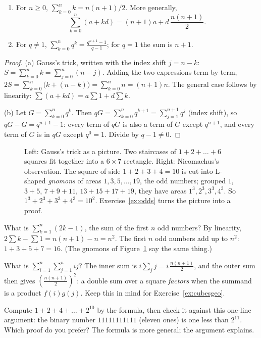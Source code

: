 \begin{propositionx}
\begin{enumerate}[label=(\alph*)]
\item For $n\ge0$, $\sum_{k=0}^nk=n(n+1)/2$. More generally,
\[
\sum_{k=0}^n(a+kd)=(n+1)a+d\,\frac{n(n+1)}2.
\]
\item For $q\ne1$, $\displaystyle\sum_{k=0}^nq^k=\frac{q^{n+1}-1}{q-1}$; for $q=1$ the sum is $n+1$.
\end{enumerate}
\end{propositionx}
\begin{proof}
(a) Gauss's trick, written with the index shift $j=n-k$: $S=\sum_{k=0}^nk=\sum_{j=0}^n(n-j)$. Adding the two expressions term by term,
$2S=\sum_{k=0}^n\bigl(k+(n-k)\bigr)=\sum_{k=0}^nn=(n+1)n$. The general case follows by linearity: $\sum(a+kd)=a\sum1+d\sum k$.

(b) Let $G=\sum_{k=0}^nq^k$. Then $qG=\sum_{k=0}^nq^{k+1}=\sum_{j=1}^{n+1}q^j$ (index shift), so $qG-G=q^{n+1}-1$: every term of $qG$ is also a term of
$G$ except $q^{n+1}$, and every term of $G$ is in $qG$ except $q^0=1$. Divide by $q-1\ne0$.
\end{proof}

\begin{figure}[ht]
\centering
{}
\caption{Left: Gauss's trick as a picture. Two staircases of $1+2+\dots+6$ squares fit together into a $6\times7$ rectangle. Right: Nicomachus's observation. The square of side $1+2+3+4=10$ is cut into L-shaped \emph{gnomons} of areas $1,3,5,\dots,19$, the odd numbers; grouped $1$, $3+5$, $7+9+11$, $13+15+17+19$, they have areas $1^3,2^3,3^3,4^3$. So $1^3+2^3+3^3+4^3=10^2$. Exercise~\ref{ex:odds} turns the picture into a proof.}
\label{fig:gauss}
\end{figure}

\begin{examplex}
What is $\sum_{k=1}^n(2k-1)$, the sum of the first $n$ odd numbers? By linearity, $2\sum k-\sum1=n(n+1)-n=n^2$. The first $n$ odd numbers add up to
$n^2$: $1+3+5+7=16$. (The gnomons of Figure~\ref{fig:gauss} say the same thing.)

What is $\sum_{i=1}^n\sum_{j=1}^nij$? The inner sum is $i\sum_jj=i\,\frac{n(n+1)}2$, and the outer sum then gives
$\left(\frac{n(n+1)}2\right)^2$: a double sum over a square \emph{factors} when the summand is a product $f(i)g(j)$. Keep this in mind for Exercise~\ref{ex:cubesgeo}.
\end{examplex}

\begin{think}
Compute $1+2+4+\dots+2^{10}$ by the formula, then check it against this one-line argument: the binary number $11111111111$ (eleven ones) is one
less than $2^{11}$. Which proof do you prefer? The formula is more general; the argument explains.
\end{think}

